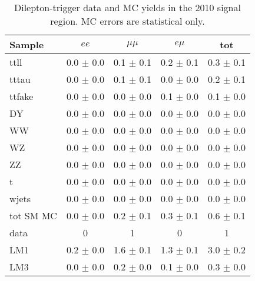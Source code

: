 \begin{table}[hbt]
\begin{center}
\footnotesize
\caption{\label{tab:lowptsigyield1} Dilepton-\Ht trigger data and MC yields in the 2010 signal region. 
MC errors are statistical only.}
\begin{tabular}{l|cccc}
\hline
         Sample   &           $ee$   &       $\mu\mu$   &         $e\mu$   &            tot  \\
\hline
           ttll   &  0.0 $\pm$ 0.0   &  0.1 $\pm$ 0.1   &  0.2 $\pm$ 0.1   &  0.3 $\pm$ 0.1  \\
          tttau   &  0.0 $\pm$ 0.0   &  0.1 $\pm$ 0.1   &  0.0 $\pm$ 0.0   &  0.2 $\pm$ 0.1  \\
         ttfake   &  0.0 $\pm$ 0.0   &  0.0 $\pm$ 0.0   &  0.1 $\pm$ 0.0   &  0.1 $\pm$ 0.0  \\
             DY   &  0.0 $\pm$ 0.0   &  0.0 $\pm$ 0.0   &  0.0 $\pm$ 0.0   &  0.0 $\pm$ 0.0  \\
             WW   &  0.0 $\pm$ 0.0   &  0.0 $\pm$ 0.0   &  0.0 $\pm$ 0.0   &  0.0 $\pm$ 0.0  \\
             WZ   &  0.0 $\pm$ 0.0   &  0.0 $\pm$ 0.0   &  0.0 $\pm$ 0.0   &  0.0 $\pm$ 0.0  \\
             ZZ   &  0.0 $\pm$ 0.0   &  0.0 $\pm$ 0.0   &  0.0 $\pm$ 0.0   &  0.0 $\pm$ 0.0  \\
              t   &  0.0 $\pm$ 0.0   &  0.0 $\pm$ 0.0   &  0.0 $\pm$ 0.0   &  0.0 $\pm$ 0.0  \\
          wjets   &  0.0 $\pm$ 0.0   &  0.0 $\pm$ 0.0   &  0.0 $\pm$ 0.0   &  0.0 $\pm$ 0.0  \\
\hline
      tot SM MC   &  0.0 $\pm$ 0.0   &  0.2 $\pm$ 0.1   &  0.3 $\pm$ 0.1   &  0.6 $\pm$ 0.1  \\
\hline
           data   &              0   &              1   &              0   &              1  \\
\hline
            LM1   &  0.2 $\pm$ 0.0   &  1.6 $\pm$ 0.1   &  1.3 $\pm$ 0.1   &  3.0 $\pm$ 0.2  \\
            LM3   &  0.0 $\pm$ 0.0   &  0.2 $\pm$ 0.0   &  0.1 $\pm$ 0.0   &  0.3 $\pm$ 0.0  \\
\hline
\end{tabular}
\end{center}
\end{table}


